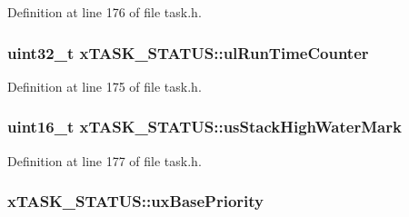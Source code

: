 Definition at line 176 of file task.\+h.

\subsubsection[{\texorpdfstring{ul\+Run\+Time\+Counter}{ulRunTimeCounter}}]{\setlength{\rightskip}{0pt plus 5cm}uint32\+\_\+t x\+T\+A\+S\+K\+\_\+\+S\+T\+A\+T\+U\+S\+::ul\+Run\+Time\+Counter}\hypertarget{structx_t_a_s_k___s_t_a_t_u_s_a92ab83f4f376c255dedf8e06a78261f7}{}\label{structx_t_a_s_k___s_t_a_t_u_s_a92ab83f4f376c255dedf8e06a78261f7}


Definition at line 175 of file task.\+h.

\subsubsection[{\texorpdfstring{us\+Stack\+High\+Water\+Mark}{usStackHighWaterMark}}]{\setlength{\rightskip}{0pt plus 5cm}uint16\+\_\+t x\+T\+A\+S\+K\+\_\+\+S\+T\+A\+T\+U\+S\+::us\+Stack\+High\+Water\+Mark}\hypertarget{structx_t_a_s_k___s_t_a_t_u_s_a284892acd41bff7c319295687a95af6b}{}\label{structx_t_a_s_k___s_t_a_t_u_s_a284892acd41bff7c319295687a95af6b}


Definition at line 177 of file task.\+h.

\subsubsection[{\texorpdfstring{ux\+Base\+Priority}{uxBasePriority}}]{ x\+T\+A\+S\+K\+\_\+\+S\+T\+A\+T\+U\+S\+::ux\+Base\+Priority}\hypertarget{structx_t_a_s_k___s_t_a_t_u_s_a692f4c8957b7270f1579cdee63ff287e}{}\label{structx_t_a_s_k___s_t_a_t_u_s_a692f4c8957b7270f1579cdee63ff287e}


